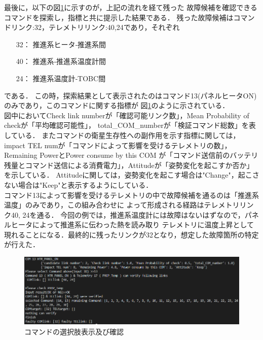 \documentclass[11pt]{jsreport}
\begin{document}
最後に，以下の図\ref{fig:COM_candidate}に示すのが，上記の流れを経て残った
故障候補を確認できるコマンドを探索し，指標と共に提示した結果である．
残った故障候補はコマンドリンク:32，テレメトリリンク:40,24であり，それぞれ
\begin{itemize}
   \item[32：]推進系ヒータ‐推進系間
   \item[40：]推進系‐推進系温度計間
   \item[24：]推進系温度計‐TOBC間   
\end{itemize}
である．
この時，探索結果として表示されたのはコマンド13(パネルヒータON)のみであり，このコマンドに関する指標が
図\ref{fig:COM_candidate}のように示されている．\\
図中においてCheck link numberが「確認可能リンク数」，Mean Probability of checkが「平均確認可能性」，
total\_COM\_numberが「検証コマンド総数」を表している．
またコマンドの衛星生存性への副作用を示す指標に関しては，
impact TEL numが「コマンドによって影響を受けるテレメトリの数」，Remaining PowerとPower consume by this COM
が「コマンド送信前のバッテリ残量とコマンド送信による消費電力」，Attitudeが「姿勢変化を起こすか否か」を示している．
Attitudeに関しては，姿勢変化を起こす場合は"Change"，起こさない場合は"Keep"と表示するようにしている．\\
コマンド13によって影響を受けるテレメトリの中で故障候補を通るのは「推進系温度」のみであり，この組み合わせに
よって形成される経路はテレメトリリンク40, 24を通る．
今回の例では，推進系温度計には故障はないはずなので，パネルヒータによって推進系に伝わった熱を読み取り
テレメトリに温度上昇として現れることになる．最終的に残ったリンクが32となり，想定した故障箇所の特定
が行えた．
\begin{figure}[H]
   \centering
      \includegraphics[width=15.0cm]{figure/COM14_TEL17_COM_phase.png}
      \caption{コマンドの選択肢表示及び確認}
      \label{fig:COM_candidate}
\end{figure}
\end{document}
